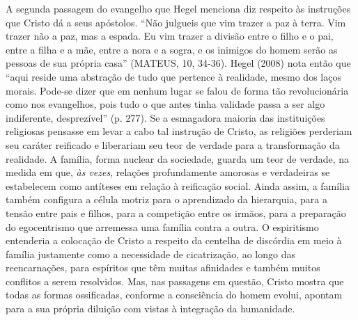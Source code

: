 A segunda passagem do evangelho que Hegel menciona diz respeito às
instruções que Cristo dá a seus apóstolos. ``Não julgueis que vim trazer
a paz à terra. Vim trazer não a paz, mas a espada. Eu vim trazer a
divisão entre o filho e o pai, entre a filha e a mãe, entre a nora e a
sogra, e os inimigos do homem serão as pessoas de sua própria casa''
(MATEUS, 10, 34-36). Hegel (2008) nota então que ``aqui reside uma
abstração de tudo que pertence à realidade, mesmo dos laços morais.
Pode-se dizer que em nenhum lugar se falou de forma tão revolucionária
como nos evangelhos, pois tudo o que antes tinha validade passa a ser
algo indiferente, desprezível'' (p. 277). Se a esmagadora maioria das
instituições religiosas pensasse em levar a cabo tal instrução de
Cristo, as religiões perderiam seu caráter reificado e liberariam seu
teor de verdade para a transformação da realidade. A família, forma
nuclear da sociedade, guarda um teor de verdade, na medida em que,
\emph{às vezes}, relações profundamente amorosas e verdadeiras se
estabelecem como antíteses em relação à reificação social. Ainda assim,
a família também configura a célula motriz para o aprendizado da
hierarquia, para a tensão entre pais e filhos, para a competição entre
os irmãos, para a preparação do egocentrismo que arremessa uma família
contra a outra. O espiritismo entenderia a colocação de Cristo a
respeito da centelha de discórdia em meio à família justamente como a
necessidade de cicatrização, ao longo das reencarnações, para espíritos
que têm muitas afinidades e também muitos conflitos a serem resolvidos.
Mas, nas passagens em questão, Cristo mostra que todas as formas
ossificadas, conforme a consciência do homem evolui, apontam para a sua
própria diluição com vistas à integração da humanidade.

